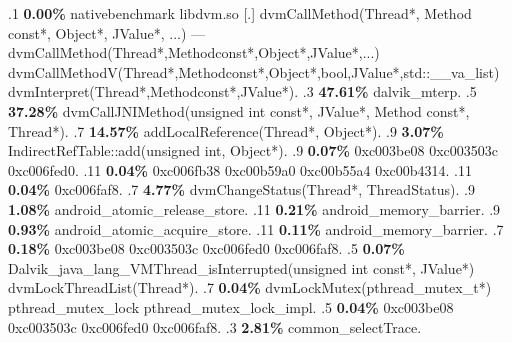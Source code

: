 \begin{profile}
{.1 \textbf{ 0.00\%} nativebenchmark  libdvm.so              [.] dvmCallMethod(Thread*, Method const*, Object*, JValue*, ...)\newline {} ---dvmCallMethod(Thread*,Methodconst*,Object*,JValue*,...)\newline {} dvmCallMethodV(Thread*,Methodconst*,Object*,bool,JValue*,std::\_\_va\_list)\newline {} dvmInterpret(Thread*,Methodconst*,JValue*). 
.3 \textbf{47.61\%} dalvik\_mterp. 
.5 \textbf{37.28\%} dvmCallJNIMethod(unsigned int const*, JValue*, Method const*, Thread*). 
.7 \textbf{14.57\%} addLocalReference(Thread*, Object*). 
.9 \textbf{3.07\%} IndirectRefTable::add(unsigned int, Object*). 
.9 \textbf{0.07\%} 0xc003be08\newline {} 0xc003503c\newline {} 0xc006fed0. 
.11 \textbf{0.04\%} 0xc006fb38\newline {} 0xc00b59a0\newline {} 0xc00b55a4\newline {} 0xc00b4314. 
.11 \textbf{0.04\%} 0xc006faf8. 
.7 \textbf{4.77\%} dvmChangeStatus(Thread*, ThreadStatus). 
.9 \textbf{1.08\%} android\_atomic\_release\_store. 
.11 \textbf{0.21\%} android\_memory\_barrier. 
.9 \textbf{0.93\%} android\_atomic\_acquire\_store. 
.11 \textbf{0.11\%} android\_memory\_barrier. 
.7 \textbf{0.18\%} 0xc003be08\newline {} 0xc003503c\newline {} 0xc006fed0\newline {} 0xc006faf8. 
.5 \textbf{0.07\%} Dalvik\_java\_lang\_VMThread\_isInterrupted(unsigned int const*, JValue*)\newline {} dvmLockThreadList(Thread*). 
.7 \textbf{0.04\%} dvmLockMutex(pthread\_mutex\_t*)\newline {} pthread\_mutex\_lock\newline {} pthread\_mutex\_lock\_impl. 
.5 \textbf{0.04\%} 0xc003be08\newline {} 0xc003503c\newline {} 0xc006fed0\newline {} 0xc006faf8. 
.3 \textbf{2.81\%} common\_selectTrace. 
}
\end{profile}
